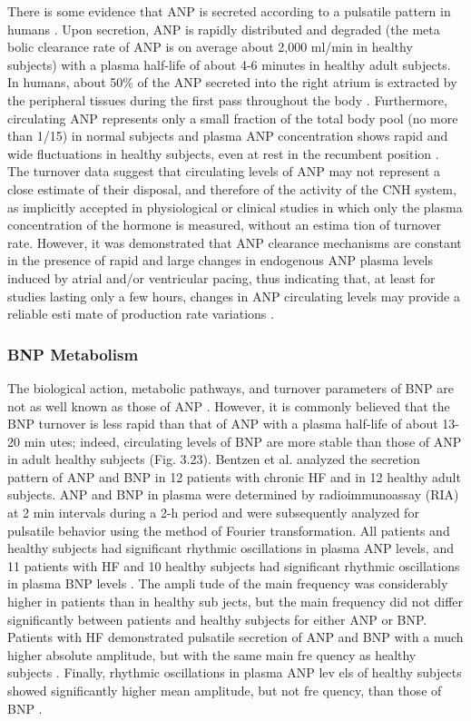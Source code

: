 \documentclass[14pt,a4paper,onecolumn]{extarticle}
\begin{document}
There is some evidence that ANP is secreted according to a pulsatile pattern in humans \citep{193-197}. Upon secretion, ANP is rapidly distributed and degraded (the meta bolic clearance rate of ANP is on average about 2,000 ml/min in healthy subjects) with a plasma half-life of about 4-6 minutes in healthy adult subjects. In humans, about 50\% of the ANP secreted into the right atrium is extracted by the peripheral tissues during the first pass throughout the body \citep{198-201}. Furthermore, circulating ANP represents only a small fraction of the total body pool (no more than 1/15) in normal subjects and plasma ANP concentration shows rapid and wide fluctuations in healthy subjects, even at rest in the recumbent position \citep{198-201}. The turnover data suggest that circulating levels of ANP may not represent a close estimate of their disposal, and therefore of the activity of the CNH system, as implicitly accepted in physiological or clinical studies in which only the plasma concentration of the hormone is measured, without an estima tion of turnover rate. However, it was demonstrated that ANP clearance mechanisms are constant in the presence of rapid and large changes in endogenous ANP plasma levels induced by atrial and/or ventricular pacing, thus indicating that, at least for studies lasting only a few hours, changes in ANP circulating levels may provide a reliable esti mate of production rate variations \citep{201}.

\subsubsection{BNP Metabolism
}
The biological action, metabolic pathways, and turnover parameters of BNP are not as well known as those of ANP \citep{14}. However, it is commonly believed that the BNP turnover is less rapid than that of ANP with a plasma half-life of about 13-20 min utes; indeed, circulating levels of BNP are more stable than those of ANP in adult healthy subjects (Fig. 3.23). Bentzen et al. \citep{197} analyzed the secretion pattern of ANP and BNP in 12 patients with chronic HF and in 12 healthy adult subjects. ANP and BNP in plasma were determined by radioimmunoassay (RIA) at 2 min intervals during a 2-h period and were subsequently analyzed for pulsatile behavior using the method of Fourier transformation. All patients and healthy subjects had significant rhythmic oscillations in plasma ANP levels, and 11 patients with HF and 10 healthy subjects had significant rhythmic oscillations in plasma BNP levels \citep{197}. The ampli tude of the main frequency was considerably higher in patients than in healthy sub jects, but the main frequency did not differ significantly between patients and healthy subjects for either ANP or BNP. Patients with HF demonstrated pulsatile secretion of ANP and BNP with a much higher absolute amplitude, but with the same main fre quency as healthy subjects \citep{197}. Finally, rhythmic oscillations in plasma ANP lev els of healthy subjects showed significantly higher mean amplitude, but not fre quency, than those of BNP \citep{197}.
\end{document}
